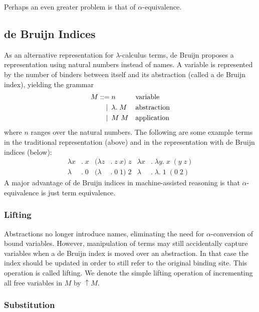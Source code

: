 \documentclass[a4paper,11pt]{article}
\begin{document}
Perhaps an even greater problem is that of $\alpha$-equivalence.


\subsection{de Bruijn Indices}

As an alternative representation for $\lambda$-calculus terms, de Bruijn
\cite{deBruijn-72} proposes a representation using natural numbers instead
of names.
A variable is represented by the number of binders between itself and its
abstraction (called a de Bruijn index), yielding the grammar
\begin{align*}
  M ::=             &\; n
  && \text{variable} \\
  \llap{\textbar\:} &\; \lambda . \; M
  && \text{abstraction} \\
  \llap{\textbar\:} &\; M \; M
  && \text{application}
\end{align*}
where $n$ ranges over the natural numbers.
The following are some example terms in the traditional representation
(above) and in the representation with de Bruijn indices (below):
\begin{align*}
  \lambda x&. \; x & (\lambda z&. \; z \; x) \; z & \lambda x&. \; \lambda y. \; x \; (y \; z)\\
  \lambda &. \; 0  & (\lambda &. \; 0 \; 1) \; 2  & \lambda &. \; \lambda . \; 1 \; (0 \; 2)
\end{align*}
A major advantage of de Bruijn indices in machine-assisted reasoning
is that $\alpha$-equivalence is just term equivalence.

\subsubsection*{Lifting}

Abstractions no longer introduce names, eliminating the need for
$\alpha$-conversion of bound variables.
However, manipulation of terms may still accidentally capture
variables when a de Bruijn index is moved over an abstraction.
In that case the index should be updated in order to still refer to the
original binding site.
This operation is called lifting. We denote the simple lifting operation
of incrementing all free variables in $M$ by $\uparrow \! M$.


\subsubsection*{Substitution}
\end{document}
